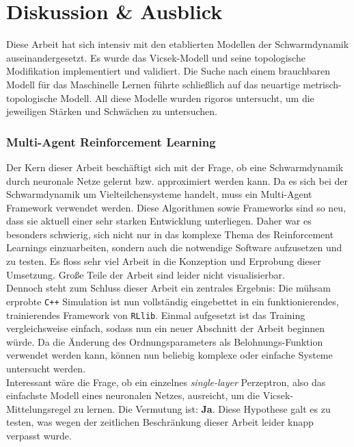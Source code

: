 \documentclass{solutionclass}
\begin{document}
\newpage
\section{Diskussion \& Ausblick}
\label{sec:Diskussion}

Diese Arbeit hat sich intensiv mit den etablierten Modellen der Schwarmdynamik auseinandergesetzt. Es wurde das Vicsek-Modell und seine topologische Modifikation implementiert und validiert. Die Suche nach einem brauchbaren Modell für das Maschinelle Lernen führte schließlich auf das neuartige metrisch-topologische Modell. All diese Modelle wurden rigoros untersucht, um die jeweiligen Stärken und Schwächen zu untersuchen.

\subsubsection*{Multi-Agent Reinforcement Learning}

Der Kern dieser Arbeit beschäftigt sich mit der Frage, ob eine Schwarmdynamik durch neuronale Netze gelernt bzw. approximiert werden kann. Da es sich bei der Schwarmdynamik um Vielteilchensysteme handelt, muss ein Multi-Agent Framework verwendet werden. Diese Algorithmen sowie Frameworks sind so neu, dass sie aktuell einer sehr starken Entwicklung unterliegen. Daher war es besonders schwierig, sich nicht nur in das komplexe Thema des Reinforcement Learnings einzuarbeiten, sondern auch die notwendige Software aufzusetzen und zu testen. Es floss sehr viel Arbeit in die Konzeption und Erprobung dieser Umsetzung. Große Teile der Arbeit sind leider nicht visualisierbar.\\

Dennoch steht zum Schluss dieser Arbeit ein zentrales Ergebnis: Die mühsam erprobte \texttt{C++} Simulation ist nun vollständig eingebettet in ein funktionierendes, trainierendes Framework von \texttt{RLlib}. Einmal aufgesetzt ist das Training vergleichsweise einfach, sodass nun ein neuer Abschnitt der Arbeit beginnen würde. Da die Änderung des Ordnungsparameters als Belohnungs-Funktion verwendet werden kann, können nun beliebig komplexe oder einfache Systeme untersucht werden.\\

Interessant wäre die Frage, ob ein einzelnes \textit{single-layer} Perzeptron, also das einfachste Modell eines neuronalen Netzes, ausreicht, um die Vicsek-Mittelungsregel zu lernen. Die Vermutung ist: \textbf{Ja}. Diese Hypothese galt es zu testen, was wegen der zeitlichen Beschränkung dieser Arbeit leider knapp verpasst wurde.
\end{document}
